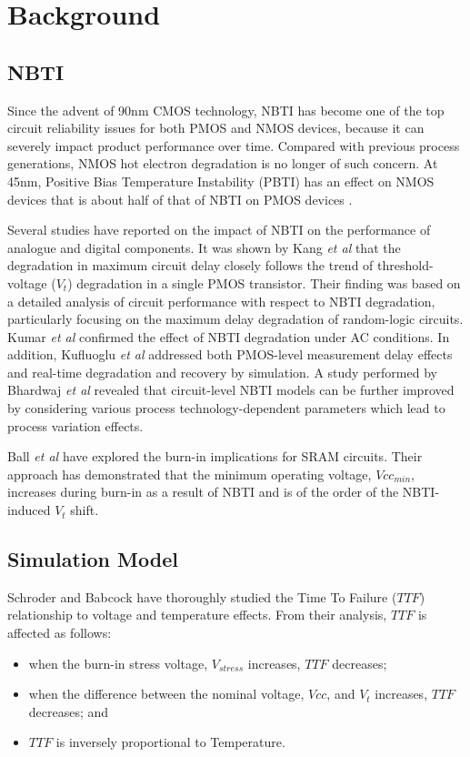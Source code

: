 \documentclass[11pt,a4paper]{article}
\begin{document}
\section{Background}
\subsection{NBTI}
Since the advent of 90nm CMOS technology, NBTI has become  one of the top circuit reliability issues for both PMOS and NMOS devices, because it can severely impact product performance over time. Compared with previous process generations, NMOS hot electron degradation is no longer of such concern. At 45nm, Positive Bias Temperature Instability (PBTI) has an effect on NMOS devices that is about half of that of NBTI on PMOS devices \cite{khan}. 

Several studies have reported on the impact of NBTI on the performance of analogue and digital components.
It was shown by Kang \textit{et al} \cite{Roy} that the degradation in maximum circuit delay closely follows the trend of threshold-voltage ($V_t$) degradation  in a single PMOS transistor. Their finding was based on a detailed analysis of circuit performance with respect to NBTI degradation, particularly focusing on the maximum delay degradation of random-logic circuits. Kumar \textit{et al} \cite{Sapatnekar} confirmed the effect of NBTI degradation under AC conditions. In addition, Kufluoglu \textit{et al} \cite{Kufluoglu} addressed both PMOS-level measurement delay effects and real-time degradation and recovery by simulation. 
A study performed by Bhardwaj \textit{et al} \cite{Cao} revealed that circuit-level NBTI models can be further improved by considering various process technology-dependent parameters which lead to process variation effects.

 Ball \textit{et al} \cite{Krishnan} have explored the burn-in implications for SRAM circuits. Their approach has demonstrated that the minimum operating voltage, $Vcc_{min}$,  increases during burn-in as a result of NBTI and is of the order of the NBTI-induced $V_t$  shift.

\subsection{Simulation Model}
Schroder and Babcock \cite{Schroder} have thoroughly studied the Time To Failure ($TTF$) relationship to voltage and temperature effects. From their analysis, $TTF$ is affected as follows:

\begin{itemize}\itemsep0pt
\item when the burn-in stress voltage, $V_{stress}$ increases, $TTF$ decreases;

\item when the difference between the nominal voltage, $Vcc$, and $V_t$ increases, $TTF$ decreases; and

\item $TTF$ is inversely proportional to Temperature.
\end{itemize}
\end{document}
